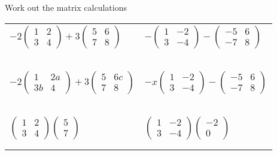 \documentclass[fontsize=20pt]{scrartcl}
\begin{document}
\newpage
Work out the matrix calculations
\newline
\newline
\begin{tabular}{p{13cm}p{13cm}}
$-2\begin{pmatrix}1&2\\3&4 \end{pmatrix}+3\begin{pmatrix}5&6\\7&8 \end{pmatrix}$
&$-\begin{pmatrix}1&-2\\3&-4 \end{pmatrix}-\begin{pmatrix}-5&6\\-7&8 \end{pmatrix}$
\\\\\\
\\\\\\

$-2\begin{pmatrix}1&2a\\3b&4 \end{pmatrix}+3\begin{pmatrix}5&6c\\7&8 \end{pmatrix}$
&$-x\begin{pmatrix}1&-2\\3&-4 \end{pmatrix}-\begin{pmatrix}-5&6\\-7&8 \end{pmatrix}$
\\\\\\
\\\\\\

$\begin{pmatrix}1&2\\3&4 \end{pmatrix}\begin{pmatrix}5\\7 \end{pmatrix}$
&$\begin{pmatrix}1&-2\\3&-4 \end{pmatrix} \begin{pmatrix}-2\\0 \end{pmatrix}$
\\\\\\
\end{tabular}
\end{document}
